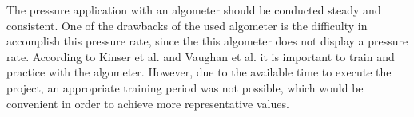 The pressure application with an algometer should be conducted steady and consistent.
One of the drawbacks of the used algometer is the difficulty in accomplish this pressure
rate, since the this algometer does not display a pressure rate.
According to Kinser et al. \cite{Kinser2009} and Vaughan et al. \cite{Vaughan2007} it is important to train and practice with the algometer.
However, due to the available time
to execute the project, an appropriate training period was not possible, which would be
convenient in order to achieve more representative values.





